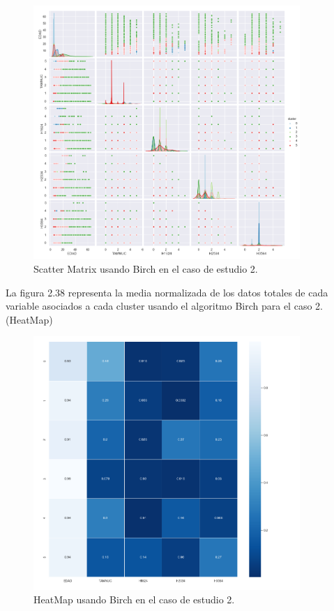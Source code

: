 	\begin{figure}[htb]
		\centering
		\includegraphics[width=0.9\textwidth]{./imagenes/caso2/scatterMatrix_caso2_Birch}
		\caption{Scatter Matrix usando Birch en el caso de estudio 2.} \label{fig:1}
	\end{figure}

	La figura 2.38 representa la media normalizada de los datos totales de cada variable asociados
	a cada cluster usando el algoritmo Birch para el caso 2.(HeatMap) \\

	\begin{figure}[htb]
		\centering
		\includegraphics[width=0.9\textwidth]{./imagenes/caso2/heatmap_caso2_Birch}
		\caption{HeatMap usando Birch en el caso de estudio 2.} \label{fig:1}
	\end{figure}

